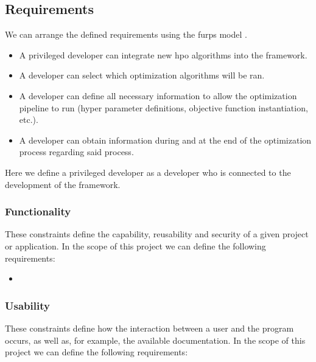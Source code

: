 
\subsection{Requirements}


We can arrange the defined requirements using the \acrfull{furps} model \parencite{furps}.

\begin{itemize}
	\item A privileged developer can integrate new \acrshort{hpo} algorithms into the framework.
	\item A developer can select which optimization algorithms will be ran.
	\item A developer can define all necessary information to allow the optimization pipeline to run (hyper parameter definitions, objective function instantiation, etc.).
	\item A developer can obtain information during and at the end of the optimization process regarding said process.
\end{itemize}

Here we define a privileged developer as a developer who is connected to the development of the framework.

\subsubsection{Functionality}

These constraints define the capability, reusability and security of a given project or application. In the scope of this project we can define the following requirements:

\begin{itemize}
	\item 
\end{itemize}

\subsubsection{Usability}

These constraints define how the interaction between a user and the program occurs, as well as, for example, the available documentation. In the scope of this project we can define the following requirements:

